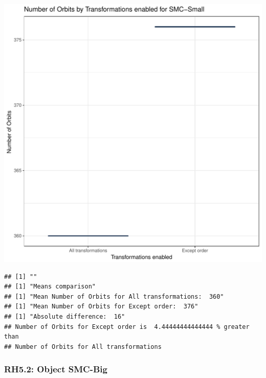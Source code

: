 \documentclass{article}\usepackage[]{graphicx}\usepackage[]{color}
\makeatletter
\def\maxwidth{ %
  \ifdim\Gin@nat@width>\linewidth
    \linewidth
  \else
    \Gin@nat@width
  \fi
}
\newenvironment{kframe}{%
 \def\at@end@of@kframe{}%
 \ifinner\ifhmode%
  \def\at@end@of@kframe{\end{minipage}}%
  \begin{minipage}{\columnwidth}%
 \fi\fi%
 \def\FrameCommand##1{\hskip\@totalleftmargin \hskip-\fboxsep
 \colorbox{shadecolor}{##1}\hskip-\fboxsep
     \hskip-\linewidth \hskip-\@totalleftmargin \hskip\columnwidth}%
 \MakeFramed {\advance\hsize-\width
   \@totalleftmargin\z@ \linewidth\hsize
   \@setminipage}}%
 {\par\unskip\endMakeFramed%
 \at@end@of@kframe}
\newenvironment{knitrout}{}{} %
\makeatother
\begin{document}
\begin{knitrout}
\color{fgcolor}
\includegraphics[width=\maxwidth]{figure/RH5_small-1} 
\begin{kframe}

{\ttfamily\noindent\bfseries\color{errorcolor}{\#\# Error in eval(expr, envir, enclos): object 'shap\_cashew\_small' not found}}\begin{verbatim}
## [1] ""
## [1] "Means comparison"
## [1] "Mean Number of Orbits for All transformations:  360"
## [1] "Mean Number of Orbits for Except order:  376"
## [1] "Absolute difference:  16"
## Number of Orbits for Except order is  4.44444444444444 % greater than 
## Number of Orbits for All transformations
\end{verbatim}
\end{kframe}
\end{knitrout}


\subsubsection{RH5.2: Object SMC-Big}
\end{document}
